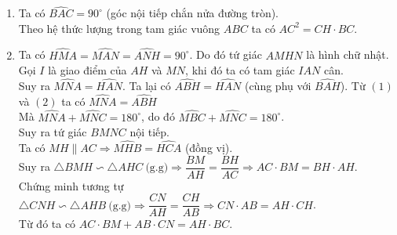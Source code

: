 \begin{bt}
{\begin{center}
\begin{tikzpicture}
			\end{tikzpicture}
	 	\end{center}  
	 	\begin{enumerate}
	 		\item Ta có $\widehat{BAC}=90^\circ$ (góc nội tiếp chắn nửa đường tròn).\\
	 		Theo hệ thức lượng trong tam giác vuông $ABC$ ta có $AC^2=CH\cdot BC$.
	 		\item Ta có $\widehat{HMA}=\widehat{MAN}=\widehat{ANH}=90^\circ$. Do đó tứ giác $AMHN$ là hình chữ nhật.\\
	 		Gọi $I$ là giao điểm của $AH$ và $MN$, khi đó ta có tam giác $IAN$ cân.\\
	 		Suy ra $\widehat{MNA}=\widehat{HAN}$.  
	 		Ta lại có $\widehat{ABH}=\widehat{HAN}$ (cùng phụ với $\widehat{BAH}$). 
	 		Từ $(1)$ và $(2)$ ta có $\widehat{MNA}=\widehat{ABH}$\\
	 		Mà $\widehat{MNA}+\widehat{MNC}=180^\circ$, do đó $\widehat{MBC}+\widehat{MNC}=180^\circ$.\\
	 		Suy ra tứ giác $BMNC$ nội tiếp.\\
	 		Ta có $ MH \parallel AC \Rightarrow \widehat{MHB}=\widehat{HCA}$ (đồng vị).\\
	 		Suy ra $\triangle BMH \backsim \triangle AHC\ \text{(g.g)} \Rightarrow \dfrac{BM}{AH}=\dfrac{BH}{AC} \Rightarrow AC\cdot BM = BH\cdot AH$.\\
	 		Chứng minh tương tự $\triangle CNH \backsim \triangle AHB\ \text{(g.g)} \Rightarrow \dfrac{CN}{AH}=\dfrac{CH}{AB}\Rightarrow CN\cdot AB = AH\cdot CH$.\\
	 		Từ đó ta có $AC\cdot BM +AB \cdot CN = AH\cdot BC$.
	 		\end{enumerate}
	 		}
\end{bt}


